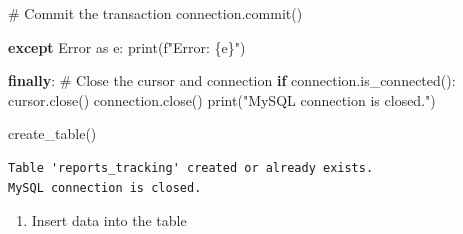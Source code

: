 \documentclass[
  letterpaper,
  DIV=11,
  numbers=noendperiod]{scrreprt}
\newenvironment{Shaded}{\begin{snugshade}}{\end{snugshade}}
\newcommand{\BuiltInTok}[1]{\textcolor[rgb]{0.00,0.23,0.31}{#1}}
\newcommand{\CommentTok}[1]{\textcolor[rgb]{0.37,0.37,0.37}{#1}}
\newcommand{\ControlFlowTok}[1]{\textcolor[rgb]{0.00,0.23,0.31}{\textbf{#1}}}
\newcommand{\ImportTok}[1]{\textcolor[rgb]{0.00,0.46,0.62}{#1}}
\newcommand{\NormalTok}[1]{\textcolor[rgb]{0.00,0.23,0.31}{#1}}
\newcommand{\SpecialCharTok}[1]{\textcolor[rgb]{0.37,0.37,0.37}{#1}}
\newcommand{\SpecialStringTok}[1]{\textcolor[rgb]{0.13,0.47,0.30}{#1}}
\newcommand{\StringTok}[1]{\textcolor[rgb]{0.13,0.47,0.30}{#1}}
\providecommand{\tightlist}{%
  \setlength{\itemsep}{0pt}\setlength{\parskip}{0pt}}\usepackage{longtable,booktabs,array}
\begin{document}
\begin{Shaded}
\begin{Highlighting}[]
          \CommentTok{\# Commit the transaction}
\NormalTok{          connection.commit()}
  
    \ControlFlowTok{except}\NormalTok{ Error }\ImportTok{as}\NormalTok{ e:}
        \BuiltInTok{print}\NormalTok{(}\SpecialStringTok{f"Error: }\SpecialCharTok{\{}\NormalTok{e}\SpecialCharTok{\}}\SpecialStringTok{"}\NormalTok{)}
    
    \ControlFlowTok{finally}\NormalTok{:}
        \CommentTok{\# Close the cursor and connection}
        \ControlFlowTok{if}\NormalTok{ connection.is\_connected():}
\NormalTok{          cursor.close()}
\NormalTok{          connection.close()}
          \BuiltInTok{print}\NormalTok{(}\StringTok{"MySQL connection is closed."}\NormalTok{)}


\NormalTok{create\_table()}
\end{Highlighting}
\end{Shaded}

\begin{verbatim}
Table 'reports_tracking' created or already exists.
MySQL connection is closed.
\end{verbatim}

\begin{enumerate}
\def\labelenumi{\arabic{enumi}.}
\setcounter{enumi}{3}
\tightlist
\item
  Insert data into the table
\end{enumerate}
\end{document}

